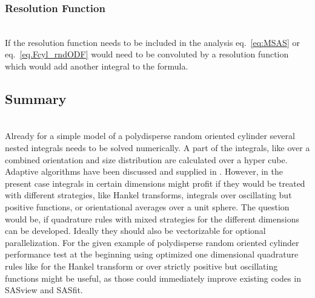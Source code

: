 
\subsubsection{Resolution Function} ~\\
If the resolution function needs to be included in the analysis eq.\ \ref{eq:MSAS} or eq.\ \ref{eq.Fcyl_rndODF} would need to be convoluted by a resolution function which would add another integral to the formula.

\subsection{Summary} ~\\

Already for a simple model of a polydisperse random oriented cylinder several nested integrals needs to be solved numerically.
A part of the integrals, like over a combined orientation and size distribution are calculated over a hyper cube. Adaptive algorithms have been discussed and supplied in \cite{Johnson2017,Genz1980,Berntsen1991,Bull1995}. However, in the present case integrals in certain dimensions might profit if they would be treated with different strategies, like Hankel transforms, integrals over oscillating but positive functions, or orientational averages over a unit sphere. The question would be, if quadrature rules with mixed strategies for the different dimensions can be developed. Ideally they should also be vectorizable for optional parallelization. For the given example of polydisperse random oriented cylinder performance test at the beginning using optimized one dimensional quadrature rules like for the Hankel transform or over strictly positive but oscillating functions might be useful, as those could immediately improve existing codes in SASview and SASfit.

